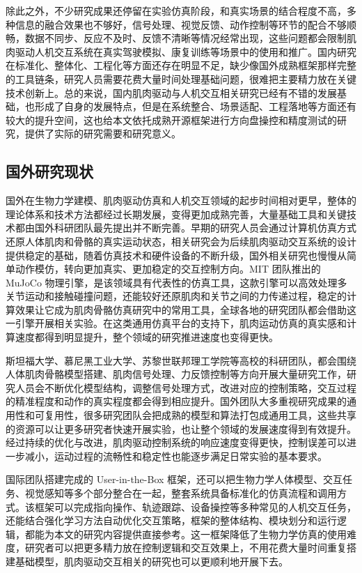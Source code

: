 除此之外，不少研究成果还停留在实验仿真阶段，和真实场景的结合程度不高，多种信息的融合效果也不够好，信号处理、视觉反馈、动作控制等环节的配合不够顺畅，数据不同步、反应不及时、反馈不清晰等情况经常出现，这些问题都会限制肌肉驱动人机交互系统在真实驾驶模拟、康复训练等场景中的使用和推广。国内研究在标准化、整体化、工程化等方面还存在明显不足，缺少像国外成熟框架那样完整的工具链条，研究人员需要花费大量时间处理基础问题，很难把主要精力放在关键技术创新上。总的来说，国内肌肉驱动与人机交互相关研究已经有不错的发展基础，也形成了自身的发展特点，但是在系统整合、场景适配、工程落地等方面还有较大的提升空间，这也给本文依托成熟开源框架进行方向盘操控和精度测试的研究，提供了实际的研究需要和研究意义。
\subsection{国外研究现状}
国外在生物力学建模、肌肉驱动仿真和人机交互领域的起步时间相对更早，整体的理论体系和技术方法都经过长期发展，变得更加成熟完善，大量基础工具和关键技术都由国外科研团队最先提出并不断完善。早期的研究人员会通过计算机仿真方式还原人体肌肉和骨骼的真实运动状态，相关研究会为后续肌肉驱动交互系统的设计提供稳定的基础，随着仿真技术和硬件设备的不断升级，国外相关研究也慢慢从简单动作模仿，转向更加真实、更加稳定的交互控制方向。MIT 团队推出的 MuJoCo 物理引擎，是该领域具有代表性的仿真工具，这款引擎可以高效处理多关节运动和接触碰撞问题，还能较好还原肌肉和关节之间的力传递过程，稳定的计算效果让它成为肌肉骨骼仿真研究中的常用工具，全球各地的研究团队都会借助这一引擎开展相关实验\cite{sitaram2026biomechanical}。在这类通用仿真平台的支持下，肌肉运动仿真的真实感和计算速度都得到明显提升，整个领域的研究推进速度也变得更快。

斯坦福大学、慕尼黑工业大学、苏黎世联邦理工学院等高校的科研团队，都会围绕人体肌肉骨骼模型搭建、肌肉信号处理、力反馈控制等方向开展大量研究工作，研究人员会不断优化模型结构，调整信号处理方式，改进对应的控制策略，交互过程的精准程度和动作的真实程度都会得到相应提升\cite{liu2026enhancing}。国外团队大多重视研究成果的通用性和可复用性，很多研究团队会把成熟的模型和算法打包成通用工具，这些共享的资源可以让更多研究者快速开展实验，也让整个领域的发展速度得到有效提升。经过持续的优化与改进，肌肉驱动控制系统的响应速度变得更快，控制误差可以进一步减小，运动过程的流畅性和稳定性也能逐步满足日常实验的基本要求。

国际团队搭建完成的 User-in-the-Box 框架，还可以把生物力学人体模型、交互任务、视觉感知等多个部分整合在一起，整套系统具备标准化的仿真流程和调用方式。该框架可以完成指向操作、轨迹跟踪、设备操控等多种常见的人机交互任务，还能结合强化学习方法自动优化交互策略，框架的整体结构、模块划分和运行逻辑，都能为本文的研究内容提供直接参考。这一框架降低了生物力学仿真的使用难度，研究者可以把更多精力放在控制逻辑和交互效果上，不用花费大量时间重复搭建基础模型，肌肉驱动交互相关的研究也可以更顺利地开展下去\cite{renganathan2026simulation}。

